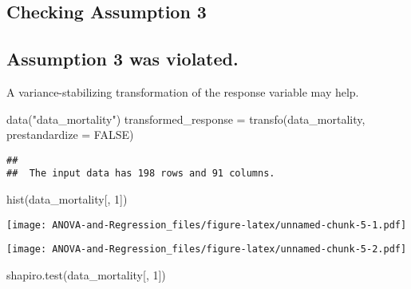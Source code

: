 \documentclass[
]{book}
\newenvironment{Shaded}{\begin{snugshade}}{\end{snugshade}}
\newcommand{\AttributeTok}[1]{\textcolor[rgb]{0.77,0.63,0.00}{#1}}
\newcommand{\ConstantTok}[1]{\textcolor[rgb]{0.00,0.00,0.00}{#1}}
\newcommand{\DecValTok}[1]{\textcolor[rgb]{0.00,0.00,0.81}{#1}}
\newcommand{\FunctionTok}[1]{\textcolor[rgb]{0.00,0.00,0.00}{#1}}
\newcommand{\NormalTok}[1]{#1}
\newcommand{\OtherTok}[1]{\textcolor[rgb]{0.56,0.35,0.01}{#1}}
\newcommand{\SpecialCharTok}[1]{\textcolor[rgb]{0.00,0.00,0.00}{#1}}
\newcommand{\StringTok}[1]{\textcolor[rgb]{0.31,0.60,0.02}{#1}}
\begin{document}
\hypertarget{checking-assumption-3}{%
\subsection{Checking Assumption 3}\label{checking-assumption-3}}

\hypertarget{assumption-3-was-violated.}{%
\subsection{Assumption 3 was violated.}\label{assumption-3-was-violated.}}

A variance-stabilizing transformation of the response variable may help.

\begin{Shaded}
\begin{Highlighting}[]
\FunctionTok{data}\NormalTok{(}\StringTok{"data\_mortality"}\NormalTok{)}
\NormalTok{transformed\_response }\OtherTok{=} \FunctionTok{transfo}\NormalTok{(data\_mortality, }\AttributeTok{prestandardize =} \ConstantTok{FALSE}\NormalTok{)}
\end{Highlighting}
\end{Shaded}

\begin{verbatim}
##  
##  The input data has 198 rows and 91 columns.
\end{verbatim}

\begin{Shaded}
\begin{Highlighting}[]
\FunctionTok{hist}\NormalTok{(data\_mortality[, }\DecValTok{1}\NormalTok{])}
\end{Highlighting}
\end{Shaded}

\texttt{[image: ANOVA-and-Regression\_files/figure-latex/unnamed-chunk-5-1.pdf]}

\begin{Shaded}
\end{Shaded}

\texttt{[image: ANOVA-and-Regression\_files/figure-latex/unnamed-chunk-5-2.pdf]}

\begin{Shaded}
\begin{Highlighting}[]
\FunctionTok{shapiro.test}\NormalTok{(data\_mortality[, }\DecValTok{1}\NormalTok{])}
\end{Highlighting}
\end{Shaded}
\end{document}

